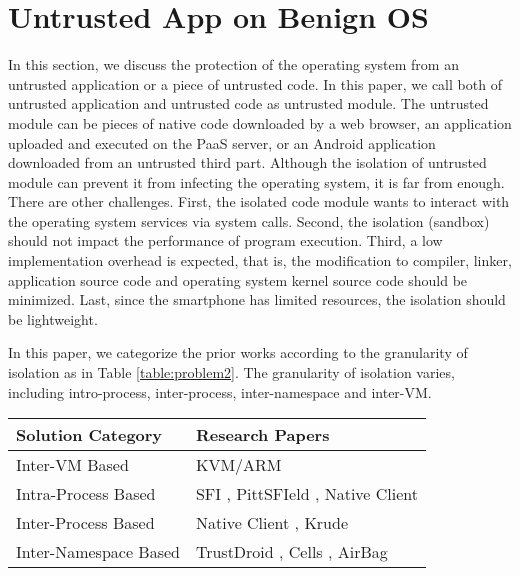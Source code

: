 \section{Untrusted App on Benign OS}
\label{sec:problem2}

In this section, we discuss the protection of the operating system from an
untrusted application or a piece of untrusted code. In this paper, we call both
of untrusted application and untrusted code as untrusted module. The untrusted
module can be pieces of native code downloaded by a web browser, an application
uploaded and executed on the PaaS server, or an Android application downloaded
from an untrusted third part. Although the isolation of untrusted module can
prevent it from infecting the operating system, it is far from enough. There
are other challenges. First, the isolated code module wants to interact with
the operating system services via system calls. Second, the isolation (sandbox)
should not impact the performance of program execution. Third, a low
implementation overhead is expected, that is, the modification to compiler,
linker, application source code and operating system kernel source code should
be minimized. Last, since the smartphone has limited resources, the isolation
should be lightweight. 

In this paper, we categorize the prior works according to the granularity of
isolation as in Table \ref{table:problem2}. The granularity of isolation varies,
including intro-process, inter-process, inter-namespace and inter-VM. 

\begin{table*}[ht]
	\centering
	\begin{tabular}{|l|l|}
		\hline
		\textbf{Solution Category}      & \textbf{Research Papers} \\ \hline
		Inter-VM Based         & KVM/ARM \cite{KVM/ARM} \\ \hline
		Intra-Process Based    & SFI \cite{SFI}, PittSFIeld \cite{PittSFIeld}, Native Client \cite{NaCl} \\ \hline
		Inter-Process Based    & Native Client \cite{NaCl}, Krude \etal \cite{Krude} \\ \hline
		Inter-Namespace Based  & TrustDroid \cite{TrustDroid}, Cells \cite{Cells}, AirBag \cite{AirBag} \\ \hline	
	\end{tabular}
	\caption{Solution categorization on the protection of OS from the untrusted
	application.}
	\label{table:problem2}
\end{table*}

